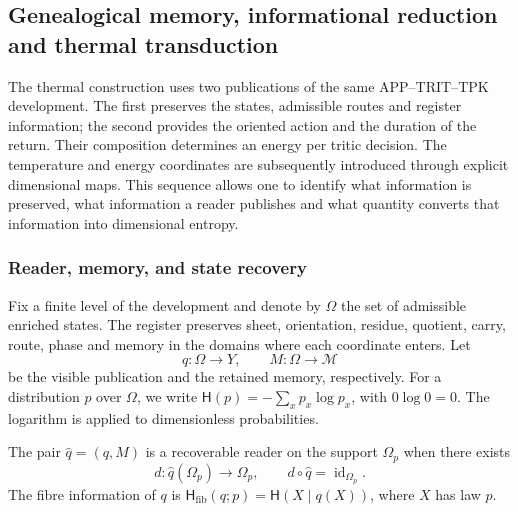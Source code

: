 
\subsection{Genealogical memory, informational reduction and thermal transduction}
\label{ii:sec:ii-kb-aut-desarrollo}

The thermal construction uses two publications of the same
APP--TRIT--TPK development. The first preserves the states, admissible routes and
register information; the second provides the oriented action
and the duration of the return. Their composition determines an energy per
tritic decision. The temperature and energy coordinates are subsequently
introduced through explicit dimensional maps. This sequence
allows one to identify what information is preserved, what information a reader
publishes and what quantity converts that information into dimensional entropy.

\subsubsection{Reader, memory, and state recovery}

Fix a finite level of the development and denote by \(\Omega\) the
set of admissible enriched states. The register preserves sheet,
orientation, residue, quotient, carry, route, phase and memory in the
domains where each coordinate enters. Let
\[
 q:\Omega\longrightarrow Y,\qquad
 M:\Omega\longrightarrow\mathcal M
\]
be the visible publication and the retained memory, respectively. For a
distribution \(p\) over \(\Omega\), we write
\(\mathsf H(p)=-\sum_xp_x\log p_x\), with \(0\log0=0\).
The logarithm is applied to dimensionless probabilities.

\begin{definition}
The pair \(\widehat q=(q,M)\) is a recoverable reader on the support
\(\Omega_p\) when there exists
\[
 d:\widehat q(\Omega_p)\longrightarrow\Omega_p,
 \qquad d\circ\widehat q=\operatorname{id}_{\Omega_p}.
\]
The fibre information of \(q\) is
\(\mathsf H_{\mathrm{fib}}(q;p)=\mathsf H(X\mid q(X))\), where
\(X\) has law \(p\).
\end{definition}

